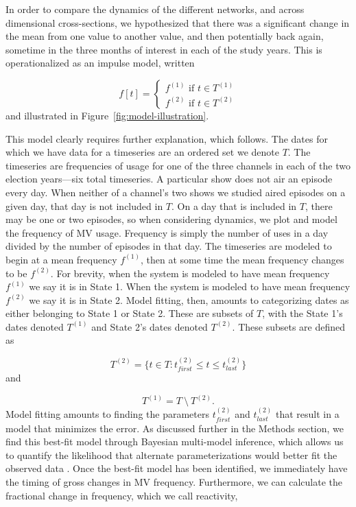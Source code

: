 In order to compare the dynamics of the different networks, and across 
dimensional cross-sections, we hypothesized that there was a 
significant change in the mean from one value to another value, and then
potentially back again,
sometime in the three months of interest in each of the study years. This is
operationalized as an impulse model, written

\begin{equation}
  f[t] = \begin{cases}
      f^{(1)} \text{ if } t \in T^{(1)} \\
      f^{(2)} \text{ if } t \in T^{(2)}
    \end{cases}
  \label{eq:model}
\end{equation}
\noindent
and illustrated in Figure~\ref{fig:model-illustration}.

This model clearly requires further explanation, which follows.
The dates for which we have data for a timeseries are an ordered set 
we denote $T$. The timeseries are frequencies of usage for one of the three
channels in each of the two election years---six total timeseries.
A particular show does not air an episode every day. When neither of a channel's
two shows we studied aired episodes on a given day, that day is not included
in $T$. On a day that is included in $T$, there may be one or two episodes,
so when considering dynamics, we plot and model the frequency of
MV usage. Frequency is simply the number of uses in a day 
divided by the number of episodes in that day. 
The timeseries are modeled to begin at a mean frequency
$f^{(1)}$, then at some time the mean frequency changes to be $f^{(2)}$. 
For brevity, when the system is modeled to have mean frequency $f^{(1)}$ we say
it is in State 1. When the system is modeled to have mean frequency $f^{(2)}$ we
say it is in State 2.
Model fitting, then, amounts to categorizing dates as either belonging to
State 1 or State 2. These are subsets of $T$, with the State 1's dates
denoted $T^{(1)}$ and State 2's dates denoted $T^{(2)}$. These subsets are
defined as

\[
  T^{(2)} = \{t \in T: t_{first}^{(2)} \leq t \leq t_{last}^{(2)} \}
\]
\noindent
and 

\[
  T^{(1)} = T~\setminus~T^{(2)}.
\]
\noindent
Model fitting amounts to finding the parameters $t_{first}^{(2)}$ and $t_{last}^{(2)}$
that result in a model that minimizes the error. As discussed further in 
the Methods section, we find this best-fit model through Bayesian 
multi-model inference, which allows us to quantify the likelihood that alternate
parameterizations would better fit the observed data \cite{Burnham2011}. 
Once the best-fit model has been
identified, we immediately have the timing of gross changes in MV frequency.
Furthermore, we can calculate the fractional change in frequency, which we
call reactivity,

